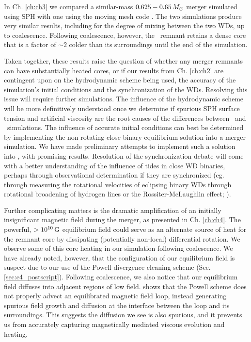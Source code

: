 In Ch. \ref{ch:ch3} we compared a similar-mass $0.625-0.65\,\Msun$ merger simulated using SPH with one using the moving mesh code \arepo.  The two simulations produce very similar results, including for the degree of mixing between the two WDs, up to coalescence.  Following coalescence, however, the \arepo\ remnant retains a dense core that is a factor of $\sim2$ colder than its surroundings until the end of the simulation.


Taken together, these results raise the question of whether any merger remnants can have substantially heated cores, or if our results from Ch. \ref{ch:ch2} are contingent upon on the hydrodynamic scheme being used, the accuracy of the simulation's initial conditions and the synchronization of the WDs.  Resolving this issue will require further simulations.  The influence of the hydrodynamic scheme will be more definitively understood once we determine if spurious SPH surface tension and artificial viscosity are the root causes of the differences between \gasoline\ and \arepo\ simulations.  The influence of accurate initial conditions can best be determined by implementing the non-rotating close binary equilibrium solution \citep{uryue98} into a merger simulation.  We have made preliminary attempts to implement such a solution into \gasoline, with promising results.  Resolution of the synchronization debate will come with a better understanding of the influence of tides in close WD binaries, perhaps through observational determination if they are synchronized (eg. through measuring the rotational velocities of eclipsing binary WDs through rotational broadening of hydrogen lines or the Rossiter-McLaughlin effect; \citealt{piro11}).

Further complicating matters is the dramatic amplification of an initially insignificant magnetic field during the merger, as presented in Ch. \ref{ch:ch4}.  The powerful, $>10^{10}\,\mathrm{G}$ equilibrium field could serve as an alternate source of heat for the remnant core by dissipating (potentially non-local) differential rotation.  We observe some of this core heating in our simulation following coalescence.  We have already noted, however, that the configuration of our equilibrium field is suspect due to our use of the Powell divergence-cleaning scheme (Sec. \ref{sec:c4_postscript}).  Following coalescence, we also notice that our equilibrium field diffuses into adjacent regions of low field.  \cite{hopkr16} shows that the Powell scheme does not properly advect an equilibrated magnetic field loop, instead generating spurious field growth and diffusion at the interface between the loop and its surroundings.  This suggests the diffusion we see is also spurious, and it prevents us from accurately capturing magnetically mediated viscous evolution and heating.

